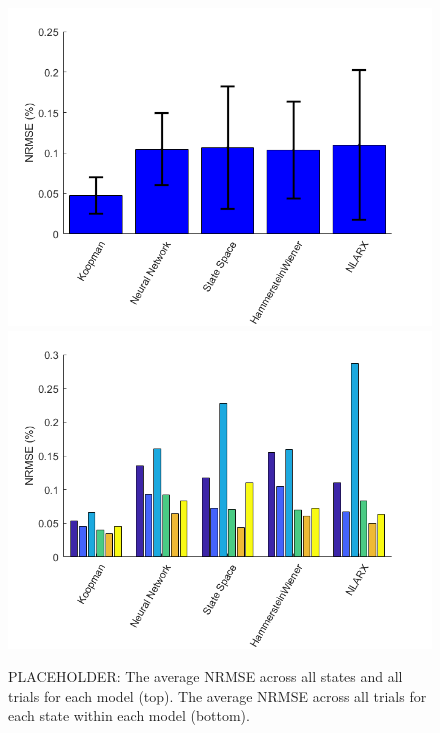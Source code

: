 \begin{figure}
    \centering
    \includegraphics[width=\linewidth]{figures/bar_ph2.png} \\
    \includegraphics[width=\linewidth]{figures/barStates_ph1.png}
    \caption{PLACEHOLDER: The average NRMSE across all states and all trials for each model (top). The average NRMSE across all trials for each state within each model (bottom).}
    \label{fig:comparison}
\end{figure}